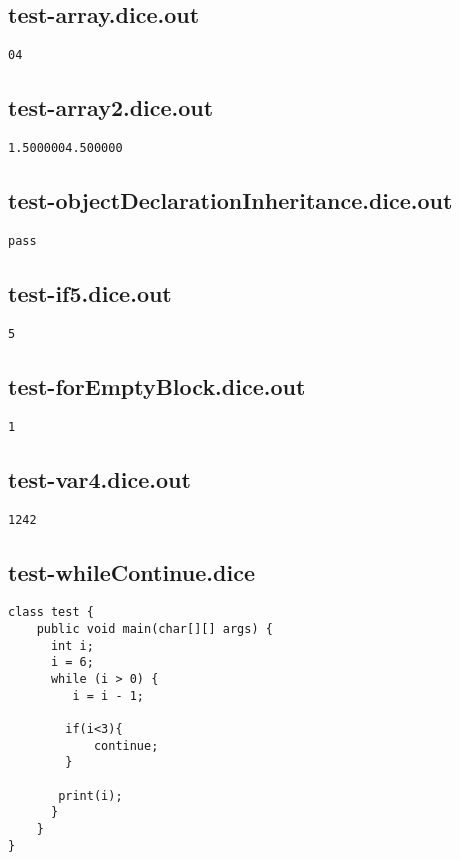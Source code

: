 \subsection{test-array.dice.out}
\begin{verbatim}
04
\end{verbatim}
\pagebreak
\subsection{test-array2.dice.out}
\begin{verbatim}
1.5000004.500000
\end{verbatim}
\pagebreak
\subsection{test-objectDeclarationInheritance.dice.out}
\begin{verbatim}
pass
\end{verbatim}
\pagebreak
\subsection{test-if5.dice.out}
\begin{verbatim}
5
\end{verbatim}
\pagebreak
\subsection{test-forEmptyBlock.dice.out}
\begin{verbatim}
1
\end{verbatim}
\pagebreak
\subsection{test-var4.dice.out}
\begin{verbatim}
1242
\end{verbatim}
\pagebreak
\subsection{test-whileContinue.dice}
\begin{verbatim}
class test {
	public void main(char[][] args) {
	  int i;
	  i = 6;
	  while (i > 0) {
	  	 i = i - 1;
	    
	    if(i<3){
	    	continue;
	    }
	   
	   print(i);
	  }
	}
}


\end{verbatim}
\pagebreak
